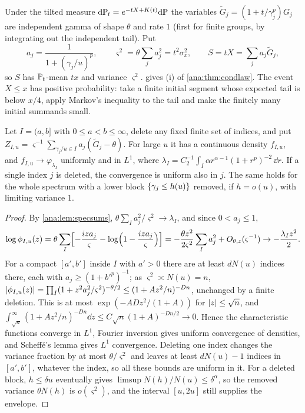 Under the tilted measure $\mathrm{d}\mathbb{P}_t=e^{-tX+K(t)}\mathrm{d}\mathbb{P}$ the variables
$\widetilde G_j=(1+t/\gamma_j^p)G_j$ are independent gamma of shape $\theta$ and rate $1$ (first for
finite groups, by integrating out the independent tail). Put
\[
 a_j=\frac1{1+(\gamma_j/u)^p},\qquad\varsigma^2=\theta\sum_ja_j^2=t^2\sigma_x^2,\qquad
 S=tX=\sum_ja_j\widetilde G_j,
\]
so $S$ has $\mathbb{P}_t$-mean $tx$ and variance $\varsigma^2$.  gives (i) of
\cref{ana:thm:condlaw}. The event $X\le x$ has positive probability: take a finite initial segment
whose expected tail is below $x/4$, apply Markov's inequality to the tail and make the finitely many
initial summands small.

\begin{lemma}\label{ana:lem:band}
Let $I=(a,b]$ with $0\le a<b\le\infty$, delete any fixed finite set of indices, and put
$Z_{I,u}=\varsigma^{-1}\sum_{\gamma_j/u\in I}a_j(\widetilde G_j-\theta)$. For large $u$ it has a
continuous density $f_{I,u}$, and $f_{I,u}\to\varphi_{\lambda_I}$ uniformly and in $L^1$, where
$\lambda_I=C_2^{-1}\int_I\alpha r^{\alpha-1}(1+r^p)^{-2}\,\dd r$. If a single index $j$ is deleted, the
convergence is uniform also in $j$. The same holds for the whole spectrum
with a lower block $\{\gamma_j\le h(u)\}$ removed, if $h=o(u)$, with limiting variance $1$.
\end{lemma}

\begin{proof}
By \cref{ana:lem:specsums}, $\theta\sum_Ia_j^2/\varsigma^2\to\lambda_I$, and since $0<a_j\le1$,
\[
 \log\phi_{I,u}(z)=\theta\sum_I\Bigl[-\frac{iza_j}\varsigma-\log\Bigl(1-\frac{iza_j}\varsigma\Bigr)\Bigr]
 =-\frac{\theta z^2}{2\varsigma^2}\sum_Ia_j^2+O_{\theta,z}(\varsigma^{-1})\to-\frac{\lambda_Iz^2}2 .
\]
For a compact $[a',b']$ inside $I$ with $a'>0$ there are at least $dN(u)$ indices there, each with
$a_j\ge(1+b'^p)^{-1}$; as $\varsigma^2\asymp N(u)=n$,
$\lvert\phi_{I,u}(z)\rvert=\prod_I(1+z^2a_j^2/\varsigma^2)^{-\theta/2}\le(1+Az^2/n)^{-Dn}$, unchanged by a finite
deletion. This is at most $\exp(-ADz^2/(1+A))$ for $\lvert z\rvert\le\sqrt n$, and
$\int_{\sqrt n}^\infty(1+Az^2/n)^{-Dn}\dd z\le C\sqrt n(1+A)^{-Dn/2}\to0$. Hence the characteristic
functions converge in $L^1$, Fourier inversion gives uniform convergence of densities, and Scheff\'e's
lemma gives $L^1$ convergence. Deleting one index changes the variance fraction by at most
$\theta/\varsigma^2$ and leaves at least $dN(u)-1$ indices in $[a',b']$, whatever the index, so all
these bounds are uniform in it. For a deleted block, $h\le\delta u$ eventually gives
$\limsup N(h)/N(u)\le\delta^\alpha$, so the removed variance $\theta N(h)$ is $o(\varsigma^2)$, and the
interval $[u,2u]$ still supplies the envelope.
\end{proof}

